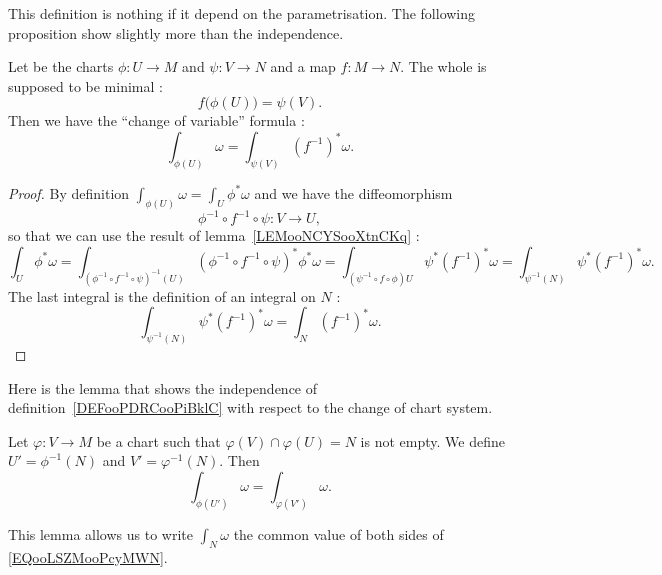 This definition is nothing if it depend on the parametrisation. The following proposition show slightly more than the independence.
\begin{proposition}       \label{PROPooNJCLooMqeeeX}
    Let be the charts \( \phi\colon U\to M\) and \( \psi\colon V\to N\) and a map \( f\colon M\to N\). The whole is supposed to be minimal :
    \begin{equation}
        f\big( \phi(U) \big)=\psi(V).
    \end{equation}
    Then we have the ``change of variable'' formula :
    \begin{equation}
        \int_{\phi(U)}\omega=\int_{\psi(V)}(f^{-1})^*\omega.
    \end{equation}
\end{proposition}

\begin{proof}
    By definition \( \int_{\phi(U)}\omega=\int_U\phi^*\omega\) and we have the diffeomorphism
    \begin{equation}
        \phi^{-1}\circ f^{-1}\circ \psi\colon V\to U,
    \end{equation}
    so that we can use the result of lemma~\ref{LEMooNCYSooXtnCKq} :
    \begin{equation}
        \int_U\phi^*\omega=\int_{(\phi^{-1}\circ f^{-1}\circ \psi)^{-1}(U)}  (\phi^{-1}\circ f^{-1}\circ \psi)^*\phi^*\omega=\int_{(\psi^{-1}\circ f\circ \phi )U}\psi^*(f^{-1})^*\omega=\int_{\psi^{-1}(N)}\psi^*(f^{-1})^*\omega.
    \end{equation}
    The last integral is the definition of an integral on \( N\) :
    \begin{equation}
        \int_{\psi^{-1}(N)}\psi^*(f^{-1})^*\omega=\int_N(f^{-1})^*\omega.
    \end{equation}
\end{proof}

Here is the lemma that shows the independence of definition~\ref{DEFooPDRCooPiBklC} with respect to the change of chart system.
\begin{lemma}
    Let \( \varphi\colon V\to M\) be a chart such that \( \varphi(V)\cap \varphi(U)=N\) is not empty. We define \( U'=\phi^{-1}(N)\) and \( V'=\varphi^{-1}(N)\). Then
    \begin{equation}        \label{EQooLSZMooPcyMWN}
        \int_{\phi(U')}\omega=\int_{\varphi(V')}\omega.
    \end{equation}
\end{lemma}
This lemma allows us to write \( \int_N\omega\) the common value of both sides of \eqref{EQooLSZMooPcyMWN}.

